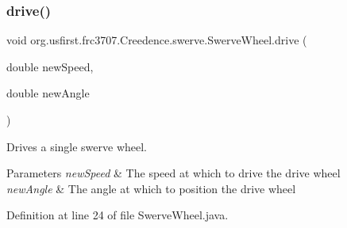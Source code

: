 \subsubsection{\texorpdfstring{drive()}{drive()}}
{\footnotesize\ttfamily void org.\+usfirst.\+frc3707.\+Creedence.\+swerve.\+Swerve\+Wheel.\+drive (\begin{DoxyParamCaption}\item[{double}]{new\+Speed,  }\item[{double}]{new\+Angle }\end{DoxyParamCaption})}

Drives a single swerve wheel.


\begin{DoxyParams}{Parameters}
{\em new\+Speed} & The speed at which to drive the drive wheel \\
\hline
{\em new\+Angle} & The angle at which to position the drive wheel \\
\hline
\end{DoxyParams}


Definition at line 24 of file Swerve\+Wheel.\+java.

